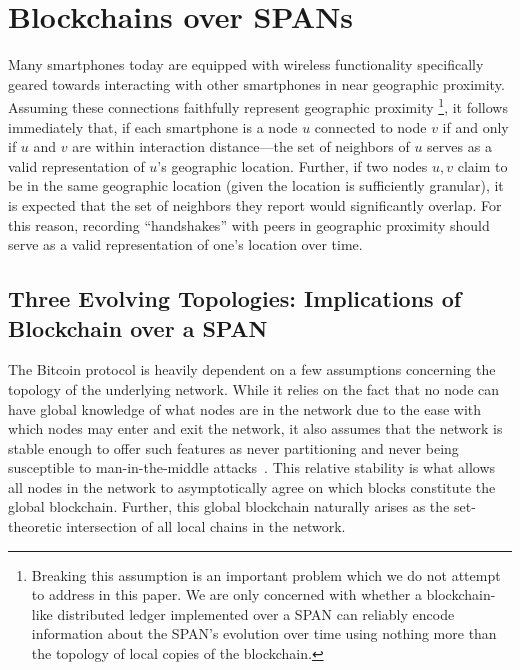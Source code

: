 \section{Blockchains over SPANs}
\label{sec:motivation}

Many smartphones today are equipped with wireless functionality specifically
geared towards interacting with other smartphones in near geographic proximity.
Assuming these connections faithfully represent geographic proximity%
\footnote{
	Breaking this assumption is an important problem which we do not attempt to
	address in this paper. We are only concerned with whether a blockchain-like distributed
	ledger implemented over a SPAN can reliably encode information about the SPAN's evolution
	over time using nothing more than the topology of local copies of the blockchain.
},
it follows immediately that, if each smartphone is a node $u$ connected to node $v$ if and only
if $u$ and $v$ are within interaction distance---the set of neighbors of $u$ serves as
a valid representation of $u$'s geographic location. Further, if two nodes $u,v$ claim to be
in the same geographic location (given the location is sufficiently granular), it is expected
that the set of neighbors they report would significantly overlap. For this reason,
recording ``handshakes'' with peers in geographic proximity should serve as a valid
representation of one's location over time.

\subsection{Three Evolving Topologies: Implications of Blockchain over a SPAN}

The Bitcoin protocol is heavily dependent on a few assumptions concerning
the topology of the underlying network. While it relies on the fact that no
node can have global knowledge of what nodes are in the network due to the
ease with which nodes may enter and exit the network, it also assumes that the
network is stable enough to offer such features as never partitioning and never
being susceptible to man-in-the-middle attacks~\cite{nakamoto2008bitcoin}. This
relative stability is what allows all nodes in the network to asymptotically
agree on which blocks constitute the global blockchain. Further, this global
blockchain naturally arises as the set-theoretic intersection of all local 
chains in the network.

